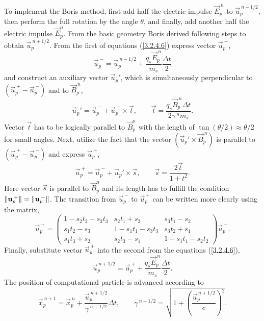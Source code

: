 To implement the Boris method, first add half the electric impulse $ \vec{E}_{p}^{\:n} $ to $ \vec{u}_{p}^{\:n-1/2} $, then perform the full rotation by the angle $ \theta $, and finally, add another half the electric impulse $ \vec{E}_{p}^{n} $. From the basic geometry Boris derived following steps to obtain $ \vec{u}_{p}^{\:n + 1/2} $. From the first of equations (\ref{3.2.4.6}) express vector $ \vec{u}_{p}^{\:-} $,
\begin{equation}
\vec{u}_{p}^{\:-} = \vec{u}_{p}^{\:n-1/2} +  \frac{q_{s} \vec{E}_{p}^{\:n}}{m_{s}} \frac{\Delta t}{2}
\end{equation}
and construct an auxiliary vector $ \vec{u}_{p}\!' $, which is simultaneously perpendicular to $ \left(\vec{u}_{p}^{\:+} - \vec{u}_{p}^{\:-} \right) $ and to $ \vec{B}_{p}^{\:n} $,
\begin{equation}
\vec{u}_{p}\!' = \vec{u}_{p}^{\:-} + \vec{u}_{p}^{\:-} \times \vec{t}, \qquad \vec{t} = \frac{q_{s} \vec{B}_{p}^{\:n} \Delta t}{2 \gamma^{\:n} m_{s}}.
\end{equation}
Vector $ \vec{t} $ has to be logically parallel to $ \vec{B}_{p}^{n} $ with the length of $ \tan \left(\theta/2\right) \approx \theta/2 $ for small angles. Next, utilize the fact that the vector $ (\vec{u}_{p}\!' \times \vec{B}_{p}^{\:n}) $ is parallel to $ \left(\vec{u}_{p}^{\:+} - \vec{u}_{p}^{\:-} \right) $ and express $ \vec{u}_{p}^{\:+} $,
\begin{equation}
\vec{u}_{p}^{\:+} = \vec{u}_{p}^{\:-} + \vec{u}_{p}\!' \times \vec{s}, \qquad \vec{s} = \frac{2\vec{t}}{1 + t^2}.
\end{equation}
Here vector $ \vec{s} $ is parallel to $ \vec{B}_{p}^{n} $ and its length has to fulfill the condition $ \lVert\mathbf{u}_{p}^{\:+}\rVert = \lVert\mathbf{u}_{p}^{\:-}\rVert $. The transition from $ \vec{u}_{p}^{\:-} $ to $ \vec{u}_{p}^{\:+} $ can be written more clearly using the matrix,
\begingroup
\renewcommand*{\arraystretch}{1.8}
\begin{equation}
\vec{u}_{p}^{\:+} =  \begin{pmatrix}
  1 - s_{2}t_{2} - s_{3}t_{3} & s_{2}t_{1} + s_{3} & s_{3}t_{1} - s_{2} \\
  s_{1}t_{2} - s_{3} & 1 - s_{1}t_{1} - s_{3}t_{3} & s_{3}t_{2} + s_{1} \\
  s_{1}t_{3} + s_{2} & s_{2}t_{3} - s_{1} & 1 - s_{1}t_{1} - s_{2}t_{2}
 \end{pmatrix}
\vec{u}_{p}^{\:-}.
\end{equation}
\endgroup
Finally, substitute vector $ \vec{u}_{p}^{\:+} $ into the second from the equations (\ref{3.2.4.6}),
\begin{equation}
\vec{u}_{p}^{\:n+1/2} = \vec{u}_{p}^{\:+} + \frac{q_{s} \vec{E}_{p}^{\:n}}{m_{s}} \frac{\Delta t}{2}.
\end{equation}
The position of computational particle is advanced according to
\begin{equation}
\vec{x}_{p}^{\:n+1} = \vec{x}_{p}^{\:n} + \frac{\vec{u}_{p}^{\:n + 1/2}}{\gamma^{\:n + 1/2}} \Delta t, \qquad \gamma^{\:n + 1/2} = \sqrt{1 + \left(\frac{\vec{u}_{p}^{\:n + 1/2}}{c}\right)^{2}}.
\end{equation}


